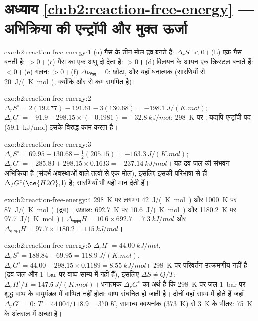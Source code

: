 \section*{अध्याय \ref{ch:b2:reaction-free-energy} --- अभिक्रिया की एन्ट्रॉपी और मुक्त ऊर्जा}

\begin{solution}{exo:b2:reaction-free-energy:1}
(a) गैस के तीन मोल द्रव बनते हैं: $\Delta_r S^\circ < 0$। (b) एक गैस
बनती है: $> 0$। (c) गैस का एक अणु दो देता है: $> 0$। (d) विलयन के आयन
एक क्रिस्टल बनाते हैं: $< 0$। (e) गलन: $> 0$। (f) $\Delta\nu_{\text{गैस}} = 0$:
छोटा, और यहाँ धनात्मक (सारणियों से \qty{+20}{J/(K.mol)}, क्योंकि 
 और  से कम सममित है)।
\end{solution}

\begin{solution}{exo:b2:reaction-free-energy:2}
$\Delta_r S^\circ = 2(192.77) - 191.61 - 3(130.68) = \qty{-198.1}{J/(K.mol)}$;
$\Delta_r G^\circ = -91.9 - 298.15 \times (-0.1981) = \qty{-32.8}{kJ/mol}$:
\qty{298}{K} पर , यद्यपि एन्ट्रॉपी पद (\qty{+59.1}{kJ/mol})
इसके विरुद्ध काम करता है।
\end{solution}

\begin{solution}{exo:b2:reaction-free-energy:3}
$\Delta_r S^\circ = 69.95 - 130.68 - \tfrac12(205.15) = \qty{-163.3}{J/(K.mol)}$;
$\Delta_r G^\circ = -285.83 + 298.15 \times 0.1633 = \qty{-237.14}{kJ/mol}$।
यह द्रव जल की संभवन अभिक्रिया है (संदर्भ अवस्थाओं वाले तत्वों से एक मोल),
इसलिए इसकी  परिभाषा से ही
$\Delta_f G^\circ(\ce{H2O}, \text{l})$ है; सारणियाँ भी यही
मान देती हैं।
\end{solution}

\begin{solution}{exo:b2:reaction-free-energy:4}
\qty{298}{K} पर लगभग \qty{42}{J/(K.mol)} और \qty{1000}{K} पर
\qty{87}{J/(K.mol)} (द्रव)। उछाल: \qty{692.7}{K} पर \qty{10.6}{J/(K.mol)} और
\qty{1180.2}{K} पर \qty{97.7}{J/(K.mol)}। $\Delta_{\text{गलन}}H = 10.6 \times
692.7 = \qty{7.3}{kJ/mol}$ और $\Delta_{\text{वाष्पन}}H = 97.7 \times 1180.2 =
\qty{115}{kJ/mol}$।
\end{solution}

\begin{solution}{exo:b2:reaction-free-energy:5}
$\Delta_r H^\circ = \qty{44.00}{kJ/mol}$, $\Delta_r S^\circ = 188.84 - 69.95 =
\qty{118.9}{J/(K.mol)}$, $\Delta_r G^\circ = 44.00 - 298.15 \times 0.1189 =
\qty{+8.55}{kJ/mol}$। \qty{298}{K} पर परिवर्तन उत्क्रमणीय नहीं है (द्रव
जल और \qty{1}{bar} पर वाष्प साम्य में नहीं हैं), इसलिए $\Delta S \ne
Q/T$: $\Delta_r H^\circ/T = \qty{147.6}{J/(K.mol)}$। धनात्मक
$\Delta_r G^\circ$ का अर्थ है कि \qty{298}{K} पर जल \qty{1}{bar} पर शुद्ध वाष्प के
वायुमंडल में वाष्पित नहीं होता: वाष्प संघनित हो जाती है। दोनों
वहाँ साम्य में होते हैं जहाँ $\Delta_r G^\circ = 0$: $T = 44\,004/118.9 =
\qty{370}{K}$, सामान्य क्वथनांक (\qty{373}{K}) से \qty{3}{K} के भीतर:
\qty{75}{K} के अंतराल में  अच्छा है।
\end{solution}

